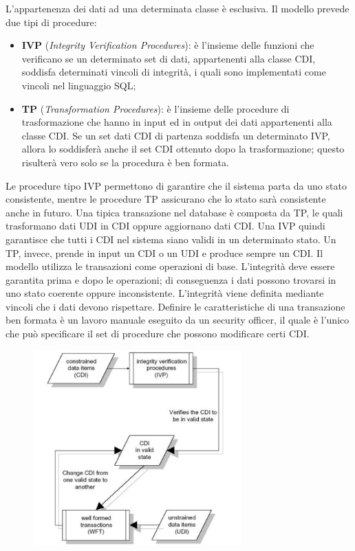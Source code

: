 L’appartenenza dei dati ad una determinata classe è esclusiva.
Il modello prevede due tipi di procedure:

\begin{itemize}
      \item \textbf{IVP} (\textit{Integrity Verification Procedures}): è
            l’insieme delle funzioni che verificano se un
            determinato set di dati, appartenenti alla classe CDI, soddisfa 
            determinati vincoli di
            integrità, i quali sono implementati come vincoli nel linguaggio SQL;
      \item \textbf{TP} (\textit{Transformation Procedures}): è l’insieme delle
            procedure di trasformazione che hanno in input
            ed in output dei dati appartenenti alla classe CDI. Se un set dati 
            CDI di partenza soddisfa
            un determinato IVP, allora lo soddisferà anche il set CDI ottenuto 
            dopo la trasformazione;
            questo risulterà vero solo se la procedura è ben formata.
\end{itemize}

Le procedure tipo IVP permettono di garantire che il sistema parta da uno stato 
consistente,
mentre le procedure TP assicurano che lo stato sarà consistente anche in futuro. 
Una tipica
transazione nel database è composta da TP, le quali trasformano dati UDI in CDI 
oppure
aggiornano dati CDI.
Una IVP quindi garantisce che tutti i CDI nel sistema siano validi in un 
determinato stato. Un TP,
invece, prende in input un CDI o un UDI e produce sempre un CDI.
Il modello utilizza le transazioni come operazioni di base. L’integrità deve 
essere garantita prima e
dopo le operazioni; di conseguenza i dati possono trovarsi in uno stato coerente 
oppure
inconsistente. L’integrità viene definita mediante vincoli che i dati devono 
rispettare.
Definire le caratteristiche di una transazione ben formata è un lavoro manuale 
eseguito da un
security officer, il quale è l’unico che può specificare il set di procedure che 
possono modificare
certi CDI.

\begin{figure}[H]
      \centering
      \includegraphics[width=8cm, keepaspectratio]{capitoli/policy/imgs/clark_wilson4.png}
\end{figure}

